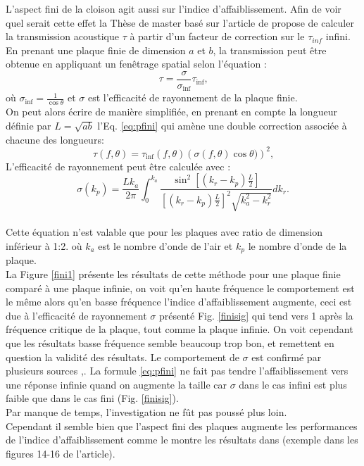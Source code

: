 \documentclass[12pt,foolscap]{report}
\begin{document}
	L'aspect fini de la cloison agit aussi sur l'indice d'affaiblissement. Afin de voir quel serait cette effet la Thèse de master basé sur l'article de \cite{villot_predicting_2001} propose de calculer la transmission acoustique $\tau$ à partir d'un facteur de correction sur le $\tau_{inf}$ infini.\\
	En prenant une plaque finie de dimension $a$ et $b$, la transmission peut être obtenue en appliquant un fenêtrage spatial selon l'équation :
	\begin{equation}
	\tau  = \frac{\sigma }{{{\sigma _{\inf }}}}{\tau _{\inf }} \text{,}
	\label{eq:pfini}\end{equation}
	où ${\sigma _{\inf }} = \frac{1}{{\cos \theta }}$ et $\sigma$ est l'efficacité de rayonnement de la plaque finie.\\
	On peut alors écrire de manière simplifiée, en prenant en compte la longueur définie par $L = \sqrt {ab} $ l'Eq. \ref{eq:pfini} qui amène une double correction associée à chacune des longueurs:
	\begin{equation}
	\tau (f,\theta ) = {\tau _{\inf }}(f,\theta ){\left( {\sigma (f,\theta )\cos \theta )} \right)^2} \text{,}
	\end{equation}
	L'efficacité de rayonnement peut être calculée avec : \\
	\begin{equation}
	\sigma ({k_p}) = \frac{{L{k_a}}}{{2\pi }}\int_0^{{k_a}} {\frac{{{{\sin }^2}\left[ {({k_r} - {k_p})\frac{L}{2}} \right]}}{{{{\left[ {({k_r} - {k_p})\frac{L}{2}} \right]}^2}\sqrt {k_a^2 - k_r^2} }}d{k_r}}\text{.}
	\end{equation} \\
	Cette équation n'est valable que pour les plaques avec ratio de dimension inférieur à 1:2.
	où $k_a$ est le nombre d'onde de l'air et $k_p$ le nombre d'onde de la plaque.\\
	La Figure \ref{fini1} présente les résultats de cette méthode pour une plaque finie comparé à une plaque infinie, on voit qu'en haute fréquence le comportement est le même alors qu'en basse fréquence l'indice d'affaiblissement augmente, ceci est due à l'efficacité de rayonnement $\sigma$ présenté Fig. \ref{finisig} qui tend vers 1 après la fréquence critique de la plaque, tout comme la plaque infinie. On voit cependant que les résultats basse fréquence semble beaucoup trop bon, et remettent en question la validité des résultats. Le comportement de $\sigma$  est confirmé par plusieurs sources \cite{allard_propagation_2009},\cite{villot_predicting_2001}. La formule \ref{eq:pfini} ne fait pas tendre l'affaiblissement vers une réponse infinie quand on augmente la taille car  $\sigma$ dans le cas infini est plus faible que dans le cas fini (Fig. \ref{finisig}).\\ Par manque de temps, l'investigation ne fût pas poussé plus loin. \\
	Cependant il semble bien que l'aspect fini des plaques augmente les performances de l'indice d'affaiblissement comme le montre les résultats dans \cite{villot_predicting_2001} (exemple dans les figures 14-16 de l'article).
	
\end{document}
